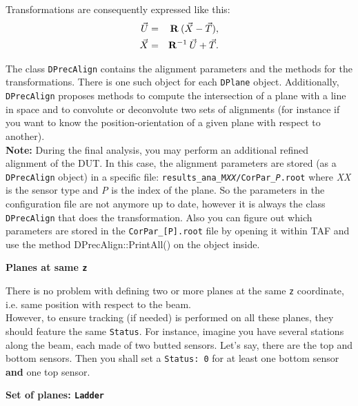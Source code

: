 \documentclass[a4paper, 12pt, twoside]{article}
\begin{document}
\noindent
Transformations are consequently expressed like this:
\begin{eqnarray*}
\vec{U} &=& {\bf R} \> ( \vec{X} - \vec{T}),\\
\vec{X} &=& {\bf R}^{-1} \> \vec{U} + \vec{T}.
\end{eqnarray*}

\noindent
The class {\tt DPrecAlign} contains the alignment parameters and the methods for the transformations. There is one such object for each {\tt DPlane} object. Additionally, {\tt DPrecAlign} proposes methods to compute the intersection of a plane with a line in space and to convolute or deconvolute two sets of alignments (for instance if you want to know the position-orientation of a given plane with respect to another).\\

\noindent
{\bf Note:} During the final analysis, you may perform an additional refined alignment of the DUT. In this case, the alignment parameters are stored (as a {\tt DPrecAlign} object) in a specific file: {\tt results\_ana\_M{\it XX}/CorPar\_{\it P}.root} where {\it XX} is the sensor type and {\it P} is the index of the plane. So the parameters in the configuration file are not anymore up to date, however it is always the class {\tt DPrecAlign} that does the transformation. Also you can figure out which parameters are stored in the {\tt CorPar\_[P].root} file by opening it within TAF and use the method {DPrecAlign::PrintAll()} on the object inside. 


\vspace{0.8 cm}

\noindent
{\bf Planes at same {\tt z}}

\noindent
There is no problem with defining two or more planes at the same {\tt z} coordinate, i.e. same position with respect to the beam.\\
However, to ensure tracking (if needed) is performed on all these planes, they should feature the same {\tt Status}. For instance, imagine you have several stations along the beam, each made of two butted sensors. Let's say, there are the top and bottom sensors. Then you shall set a {\tt Status: 0} for at least one bottom sensor {\bf and} one top sensor.\\


\vspace{0.8 cm}

\noindent
{\bf Set of planes: {\tt Ladder}}
\end{document}
